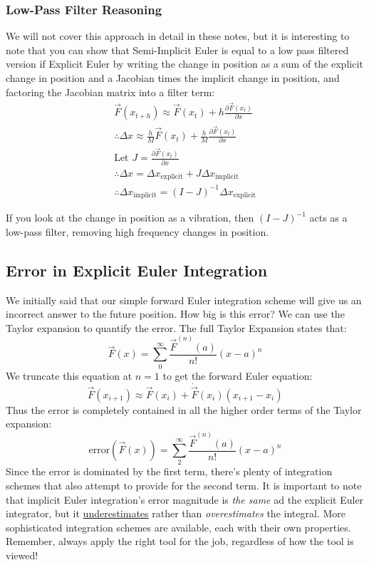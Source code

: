 \documentclass[]{article}
\begin{document}
\subsubsection{Low-Pass Filter Reasoning}

We will not cover this approach in detail in these notes, but it is interesting to note that you can show that Semi-Implicit Euler is equal to a low pass filtered version if Explicit Euler by writing the change in position as a sum of the explicit change in position and a Jacobian times the implicit change in position, and factoring the Jacobian matrix into a filter term:
\begin{eqnarray}
	\vec{F}(x_{t+h}) \approx \vec{F}(x_t) + h\frac{\partial\vec{F}(x_t)}{\partial x} \\
	\therefore \Delta x \approx \frac{h}{M}\vec{F}(x_t) + \frac{h}{M}\frac{\partial\vec{F}(x_t)}{\partial x} \\
	\text{Let } J = \frac{\partial\vec{F}(x_t)}{\partial x} \\
	\therefore \Delta x = \Delta x_{\text{explicit}} + J \Delta x_{\text{implicit}} \\
	\therefore \Delta x_{\text{implicit}} = \left(I - J\right)^{-1}\Delta x_{\text{explicit}}
\end{eqnarray}

If you look at the change in position as a vibration, then $(I - J)^{-1}$ acts as a low-pass filter, removing high frequency changes in position.

\subsection{Error in Explicit Euler Integration}

We initially said that our simple forward Euler integration scheme will give us an incorrect answer to the future position. How big is this error? We can use the Taylor expansion to quantify the error. The full Taylor Expansion states that:
\begin{equation}
	\vec{F}(x) = \sum_{0}^{\infty}\frac{\vec{F}^{(n)}(a)}{n!}(x-a)^n
\end{equation}
We truncate this equation at $n=1$ to get the forward Euler equation:
\begin{equation}
	\vec{F}(x_{i+1}) \approx \vec{F}(x_i) + \dot{\vec{F}}(x_i)(x_{i+1}-x_i)
\end{equation}
Thus the error is completely contained in all the higher order terms of the Taylor expansion:
\begin{equation}
	\text{error}(\vec{F}(x)) = \sum_{2}^{\infty}\frac{\vec{F}^{(n)}(a)}{n!}(x-a)^n
\end{equation}
Since the error is dominated by the first term, there's plenty of integration schemes that also attempt to provide for the second term. It is important to note that implicit Euler integration's error magnitude is \emph{the same} ad the explicit Euler integrator, but it \underline{underestimates} rather than \emph{overestimates} the integral. More sophisticated integration schemes are available, each with their own properties. Remember, always apply the right tool for the job, regardless of how the tool is viewed!
\end{document}
